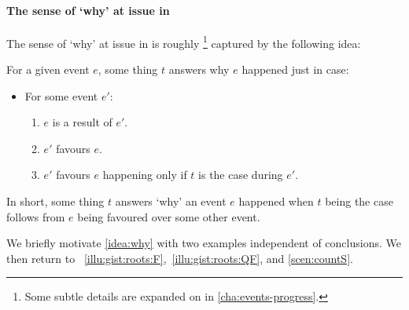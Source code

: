 \paragraph*{The sense of `why' at issue in \qWhy{}}


\begin{note}
  The sense of `why' at issue in \qWhy{} is roughly%
  \footnote{
    Some subtle details are expanded on in \autoref{cha:events-progress}.
  }
  captured by the following idea:

  \begin{idea}[`Why']%
    \label{idea:why}%
    For a given event \(e\), some thing \(t\) answers why \(e\) happened just in case:
    \begin{itemize}
    \item
      For some event \(e'\):
      \begin{enumerate}[label=\Alph*., ref=\Alph*]
      \item
        \label{idea:why:result}
        \(e\) is a result of \(e'\).
      \item
        \label{idea:why:favour}
        \(e'\) favours \(e\).
      \item
        \label{idea:why:feat}
        \(e'\) favours \(e\) happening only if \(t\) is the case during \(e'\).
      \end{enumerate}
    \end{itemize}
    \vspace{-\baselineskip}
  \end{idea}

  \noindent%
  In short, some thing \(t\) answers `why' an event \(e\) happened when \(t\) being the case follows from \(e\) being favoured over some other event.
\end{note}


\begin{note}
  We briefly motivate \autoref{idea:why} with two examples independent of conclusions.
  We then return to ~\ref{illu:gist:roots:F},~\ref{illu:gist:roots:QF}, and \ref{scen:countS}.
\end{note}



